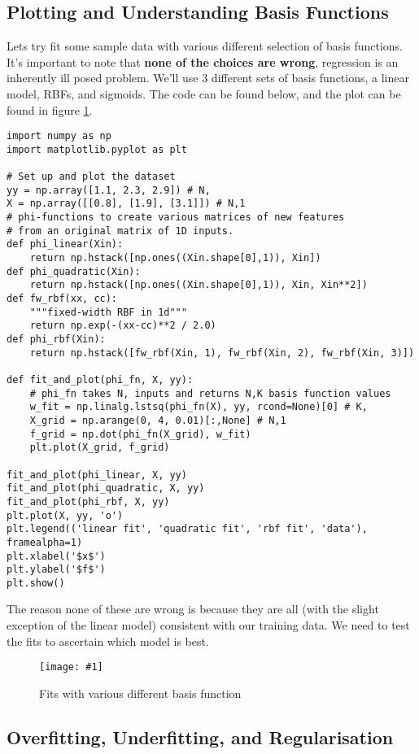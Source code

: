 \documentclass[letterpaper, 12pt]{article}
\def\figinsert#1#2#3{
    \begin{figure}[ht]
    \centering
    \texttt{[image: \#1]}
    \caption{#2}
    \label{#3}
    \end{figure}%
}
\newcommand{\1}{\mathds{1}}	%
\begin{document}
\subsection{Plotting and Understanding Basis Functions}
Lets try fit some sample data with various different selection of basis functions. It's important to note that \textbf{none of the choices are wrong}, regression is an inherently ill posed problem. We'll use 3 different sets of basis functions, a linear model, RBFs, and sigmoids. The code can be found below, and the plot can be found in figure \ref{fig: basisfit}.
\begin{verbatim}
import numpy as np
import matplotlib.pyplot as plt

# Set up and plot the dataset
yy = np.array([1.1, 2.3, 2.9]) # N,
X = np.array([[0.8], [1.9], [3.1]]) # N,1
# phi-functions to create various matrices of new features
# from an original matrix of 1D inputs.
def phi_linear(Xin):
    return np.hstack([np.ones((Xin.shape[0],1)), Xin])
def phi_quadratic(Xin):
    return np.hstack([np.ones((Xin.shape[0],1)), Xin, Xin**2])
def fw_rbf(xx, cc):
    """fixed-width RBF in 1d"""
    return np.exp(-(xx-cc)**2 / 2.0)
def phi_rbf(Xin):
    return np.hstack([fw_rbf(Xin, 1), fw_rbf(Xin, 2), fw_rbf(Xin, 3)])

def fit_and_plot(phi_fn, X, yy):
    # phi_fn takes N, inputs and returns N,K basis function values
    w_fit = np.linalg.lstsq(phi_fn(X), yy, rcond=None)[0] # K,
    X_grid = np.arange(0, 4, 0.01)[:,None] # N,1
    f_grid = np.dot(phi_fn(X_grid), w_fit)
    plt.plot(X_grid, f_grid)

fit_and_plot(phi_linear, X, yy)
fit_and_plot(phi_quadratic, X, yy)
fit_and_plot(phi_rbf, X, yy)
plt.plot(X, yy, 'o')
plt.legend(('linear fit', 'quadratic fit', 'rbf fit', 'data'), framealpha=1)
plt.xlabel('$x$')
plt.ylabel('$f$')
plt.show()
\end{verbatim}
The reason none of these are wrong is because they are all (with the slight exception of the linear model) consistent with our training data. We need to test the fits to ascertain which model is best.
\figinsert{python/lecture3/basisfit.eps}{Fits with various different basis function}{fig: basisfit}
\subsection{Overfitting, Underfitting, and Regularisation}

\newpage
\end{document}
